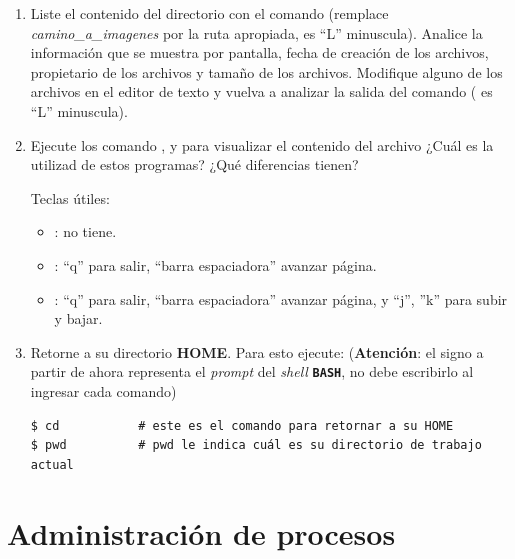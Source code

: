 \documentclass[12pt]{article}
\newcommand{\bash}{\textbf{\texttt{BASH}}}
\begin{document}
\begin{enumerate}[resume]
    \item Liste el contenido del directorio  con el comando  (remplace \emph{camino\_a\_imagenes}
        por la ruta apropiada,  es ``L'' minuscula). Analice la
        información que se muestra por pantalla, fecha de creación de los
        archivos, propietario de los archivos y tamaño de los archivos.
        Modifique alguno de los archivos en el editor de texto y vuelva a
        analizar la salida del comando ( es ``L'' minuscula).

    \item Ejecute los comando ,  y  para visualizar
        el contenido del archivo  ¿Cuál es la utilizad de
        estos programas? ¿Qué diferencias tienen?

    Teclas útiles:

    \begin{itemize}

        \itemsep2pt \parskip0pt 

        \item {}: no tiene.

        \item {}: ``q'' para salir, ``barra espaciadora'' avanzar
            página.

        \item {}: ``q'' para salir, ``barra espaciadora'' avanzar
            página, y ``j'', ''k'' para subir y bajar.

    \end{itemize}

    \item Retorne a su directorio \textbf{HOME}. Para esto ejecute:
        (\textbf{Atención}: el signo \cw{\$} a partir de ahora representa el
        \emph{prompt} del \emph{shell} \bash, no debe escribirlo al ingresar
        cada comando)

        \begin{verbatim}
$ cd           # este es el comando para retornar a su HOME
$ pwd          # pwd le indica cuál es su directorio de trabajo actual
        \end{verbatim}

\end{enumerate}

\section{Administración de procesos}
\end{document}
